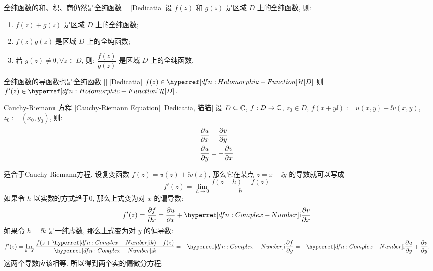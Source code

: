         \begin{ppt}
            {全纯函数的和、积、商仍然是全纯函数}
            []
            [Dedicatia]
            设 \(f(z)\) 和 \(g(z)\) 是区域 \(D\) 上的全纯函数, 则:
            \begin{enumerate}
                \item \(f(z)+g(z)\) 是区域 \(D\) 上的全纯函数;
                \item \(f(z)g(z)\) 是区域 \(D\) 上的全纯函数;
                \item 若 \(g(z)\neq 0, \forall z\in D\), 则: \(\dfrac{f(z)}{g(z)}\) 是区域 \(D\) 上的全纯函数.
            \end{enumerate}
        \end{ppt}

        \begin{ppt}
            {全纯函数的导函数也是全纯函数}
            []
            [Dedicatia]
            \(f(z)\in\Holo[D]\) 则 \(f'(z)\in\Holo[D]\).
        \end{ppt}

        \begin{thm}
            {Cauchy-Riemann 方程}
            [Cauchy-Riemann Equation]
            [Dedicatia, 猫猫]
            设 \(D\subseteq\operatorname{\mathbb{C}}\), \(f:D\to\operatorname{\mathbb{C}}\), \(z_0\in D\), \(f(x+y\ii):=u(x,y)+\ii v(x,y)\), \(z_0:=(x_0,y_0)\), 则: 
            \[
            \begin{aligned}
                & \pdv{u}{x} (x_0,y_0) = \pdv{v}{y} (x_0,y_0)\\
                & \pdv{u}{y} (x_0,y_0) = -\pdv{v}{x} (x_0,y_0)
            \end{aligned}
            \]
        \end{thm}
        
        \begin{prf}
            \Holomorphic{} 适合于Cauchy-Riemann方程. 设复变函数 \(f(z)=u(z)+\ii v(z)\), 那么它在某点 \(z=x+\ii y\) 的导数就可以写成
            \[f'(z)=\lim_{h\to 0}\frac{f(z+h)-f(z)}{h}\]
            如果令 \(h\) 以实数的方式趋于0, 那么上式变为对 \(x\) 的偏导数: 
            \[f'(z)=\pdv{f}{x}=\pdv{u}{x}+\ii\pdv{v}{x}\]
            如果令 \(h=\ii k\) 是一纯虚数, 那么上式变为对 \(y\) 的偏导数: 
            \[f'(z)=\lim_{k\to 0}\frac{f(z+\ii k)-f(z)}{\ii k}=-\ii\pdv{f}{y}=-\ii\pdv{u}{y}+\pdv{v}{y}.\]
            这两个导数应该相等. 所以得到两个实的偏微分方程: 
        \end{prf}
        
